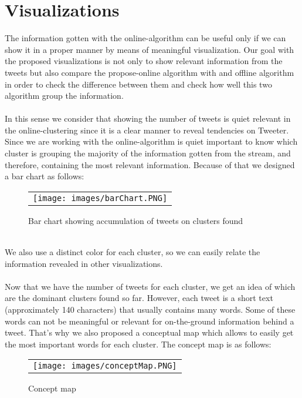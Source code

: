 \documentclass{article}
\begin{document}
\section{Visualizations}
The information gotten with the online-algorithm can be useful only if we can show it in a proper manner by means of meaningful visualization. Our goal with the proposed visualizations is not only to show relevant information from the tweets but also compare the propose-online algorithm with and offline algorithm in order to check the difference between them and check how well this two algorithm group the information.
\\
\\
In this sense we consider that showing the number of tweets is quiet relevant in the online-clustering since it is a clear manner to reveal tendencies on Tweeter. Since we are working with the online-algorithm is quiet important to know which cluster is grouping the majority of the information gotten from the stream, and therefore, containing the most relevant information. Because of that we designed a bar chart as follows:
\begin{figure}[htb]
\hspace*{-90pt}
\centering
  \begin{tabular}{@{}c@{}}
    \texttt{[image: images/barChart.PNG]} 
    \hspace*{-80pt}
    &
  \end{tabular}
  \vspace{-5pt}
  \caption{Bar chart showing accumulation of tweets on clusters found}
\end{figure}
\\
We also use a distinct color for each cluster, so we can easily relate the information revealed in other visualizations.
\\
\\
Now that we have the number of tweets for each cluster, we get an idea of which are the dominant clusters found so far. However, each tweet is a short text (approximately 140 characters) that usually contains many words. Some of these words can not be meaningful or relevant for on-the-ground information behind a tweet. That's why we also proposed a conceptual map which allows to easily get the most important words for each cluster. The concept map is as follows:
\\
\begin{figure}[htb]
\hspace*{-90pt}
\centering
  \begin{tabular}{@{}c@{}}
    \texttt{[image: images/conceptMap.PNG]} 
    \hspace*{-80pt}
    &
  \end{tabular}
  \vspace{-5pt}
  \caption{Concept map}
\end{figure}
\end{document}
